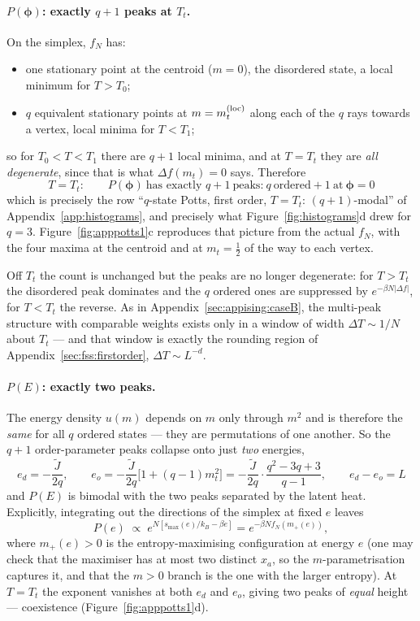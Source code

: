 \documentclass[10pt,a4paper]{article}
\theoremstyle{remark}
\begin{document}
\paragraph{$P(\boldsymbol{\phi})$: exactly $q+1$ peaks at $T_t$.} On the
simplex, $f_N$ has:
\begin{itemize}
\item one stationary point at the centroid ($m=0$), the disordered state, a local
minimum for $T>T_0$;
\item $q$ equivalent stationary points at $m=m_t^{\rm(loc)}$ along each of the $q$
rays towards a vertex, local minima for $T<T_1$;
\end{itemize}
so for $T_0<T<T_1$ there are $q+1$ local minima, and at $T=T_t$ they are
\emph{all degenerate}, since that is what $\Delta f(m_t)=0$ says. Therefore
\[
\;T=T_t:\qquad P(\boldsymbol{\phi})\ \text{has exactly }q+1\ \text{peaks:}\ q\ \text{ordered}+1\ \text{at}\ \boldsymbol{\phi}=0\
\]
which is precisely the row ``$q$-state Potts, first order, $T=T_t$:
$(q{+}1)$-modal'' of Appendix~\ref{app:histograms}, and precisely what
Figure~\ref{fig:histograms}d drew for $q=3$. Figure~\ref{fig:apppotts1}c
reproduces that picture from the actual $f_N$, with the four maxima at the
centroid and at $m_t=\tfrac12$ of the way to each vertex.

Off $T_t$ the count is unchanged but the peaks are no longer degenerate: for
$T>T_t$ the disordered peak dominates and the $q$ ordered ones are suppressed by
$e^{-\beta N|\Delta f|}$, for $T<T_t$ the reverse. As in
Appendix~\ref{sec:appising:caseB}, the multi-peak structure with comparable
weights exists only in a window of width $\Delta T\sim1/N$ about $T_t$ --- and
that window is exactly the rounding region of
Appendix~\ref{sec:fss:firstorder}, $\Delta T\sim L^{-d}$.

\paragraph{$P(E)$: exactly two peaks.} The energy density $u(m)$ depends on $m$
only through $m^{2}$ and is therefore the \emph{same} for all $q$ ordered states
--- they are permutations of one another. So the $q+1$ order-parameter peaks
collapse onto just \emph{two} energies,
\[
\;
e_d=-\frac{\tilde J}{2q},
\qquad
e_o=-\frac{\tilde J}{2q}\big[1+(q-1)m_t^{2}\big]
=-\frac{\tilde J}{2q}\cdot\frac{q^{2}-3q+3}{q-1},
\qquad e_d-e_o=L\
\]
and $P(E)$ is bimodal with the two peaks separated by the latent heat. Explicitly,
integrating out the directions of the simplex at fixed $e$ leaves
\[
P(e)\;\propto\;e^{N[s_{\max}(e)/k_B-\beta e]}
=e^{-\beta N f_N(m_+(e))} ,
\]
where $m_+(e)>0$ is the entropy-maximising configuration at energy $e$ (one may
check that the maximiser has at most two distinct $x_a$, so the
$m$-parametrisation captures it, and that the $m>0$ branch is the one with the
larger entropy). At $T=T_t$ the exponent vanishes at both $e_d$ and $e_o$, giving
two peaks of \emph{equal} height --- coexistence
(Figure~\ref{fig:apppotts1}d).
\end{document}
